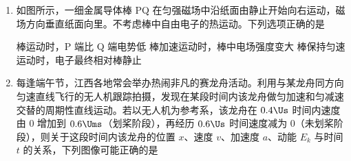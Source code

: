 \documentclass[\gkver]{gaokaozhenti}
\begin{document}
\begin{enumerate}
{$2r_{1} = D + 2\Delta x\tan\frac{\theta}{2}$

同理可知，轮子与内铁轨接触的位置半径减小为 $r_{2}$，则有

$2r_{2} = D - 2\Delta x\tan\frac{\theta}{2}$

设一段时间内，外轨道轮子与铁轨接触的位置向前运动的距离为 $s_{1}$，内轨道轮子与铁轨接触的位置向前运动的距离为 $s_{2}$，由于两轮固定连接为一体，且轮子不打滑，则有

$\frac{s_{1}}{s_{2}} = \frac{r_{1}}{r_{2}} = \frac{D + 2\Delta x\tan\frac{\theta}{2}}{D - 2\Delta x\tan\frac{\theta}{2}}$

由于 $\tan\frac{\theta}{2} \approx \frac{\theta}{2}$

则有 $\frac{s_{1}}{s_{2}} = \frac{D + \theta \Delta x}{D - \theta \Delta x}$

转弯过程俯视图，如图所示


由几何关系有 $\frac{s_{1}}{s_{2}} = \frac{R + \frac{L}{2}}{R - \frac{L}{2}}$

联立解得 $R = \frac{LD}{2\theta \Delta x}$

故选 C。
}

\item
如图所示，一细金属导体棒 PQ 在匀强磁场中沿纸面由静止开始向右运动，磁场方向垂直纸面向里。不考虑棒中自由电子的热运动。下列选项正确的是


{棒运动时，P 端比 Q 端电势低}
{棒加速运动时，棒中电场强度变大}
{棒保持匀速运动时，电子最终相对棒静止}


\item
每逢端午节，江西各地常会举办热闹非凡的赛龙舟活动。利用与某龙舟同方向匀速直线飞行的无人机跟踪拍摄，发现在某段时间内该龙舟做匀加速和匀减速交替的周期性直线运动。若以无人机为参考系，该龙舟在 $0.4 \Us$ 时间内速度由 0 增加到 $0.6 \Ums$（划桨阶段），再经历 $0.6 \Us$ 时间速度减为 0（未划桨阶段），则关于这段时间内该龙舟的位置 $x$、速度 $v$、加速度 $a$、动能 $E_{k}$ 与时间 $t$ 的关系，下列图像可能正确的是 


\end{enumerate}
\end{document}

